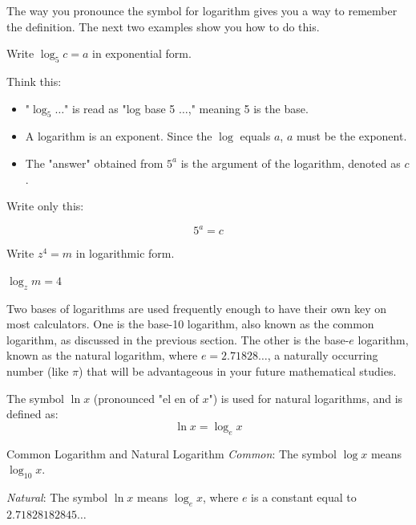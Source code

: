 The way you pronounce the symbol for logarithm gives you a way to remember the definition. The next two examples show you how to do this.

\begin{example} Write $\log _5 c=a$ in exponential form.

\begin{solution}

Think this:
\begin{itemize}
    \item "\(\log_5 \ldots\)" is read as "log base 5 \(\ldots\)," meaning 5 is the base.
    \item A logarithm is an exponent. Since the \(\log\) equals \(a\), \(a\) must be the exponent.
    \item The "answer" obtained from \(5^a\) is the argument of the logarithm, denoted as \(c\).
\end{itemize}

Write only this: 

\[
5^a = c
\]
\end{solution}
\end{example}

\begin{example} Write $z^4=m$ in logarithmic form.

\begin{solution}
    $\log _z m=4$
\end{solution}
    
\end{example}

Two bases of logarithms are used frequently enough to have their own key on most calculators. One is the base-10 logarithm, also known as the common logarithm, as discussed in the previous section. The other is the base-\(e\) logarithm, known as the natural logarithm, where \(e = 2.71828 \ldots\), a naturally occurring number (like \(\pi\)) that will be advantageous in your future mathematical studies.

The symbol \(\ln x\) (pronounced "el en of \(x\)") is used for natural logarithms, and is defined as:
\[
\ln x = \log_e x
\]

\begin{definition}{Common Logarithm and Natural Logarithm}
\hspace{1cm} \textit{Common}: The symbol $\log x$ means $\log _{10} x$.

\hspace{1cm}  \textit{Natural}: \hspace{0.2cm}The symbol $\ln x$ means $\log _e x$, where $e$ is a constant equal to $2.71828182845 \ldots$
\end{definition}

